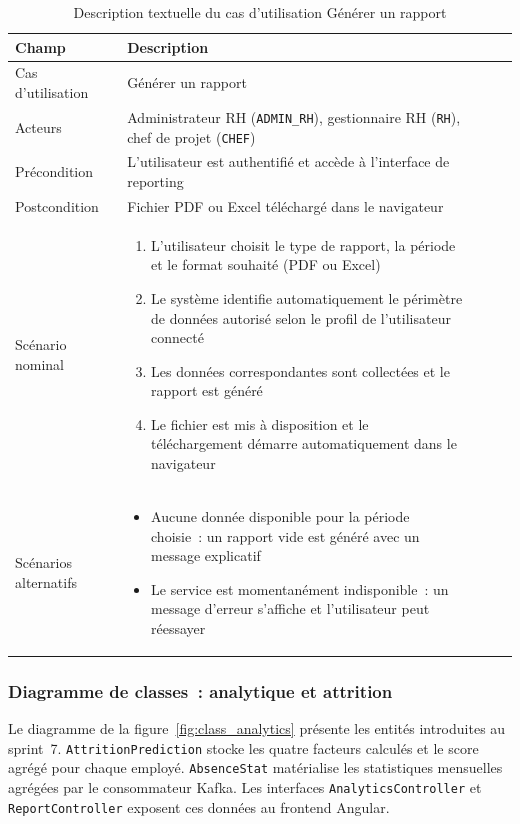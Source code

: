\begin{table}[H]
\centering
\caption{Description textuelle du cas d’utilisation Générer un rapport}
\label{tab:uc_rapport}
\begin{tabularx}{\textwidth}{VlVLV}
\hline
\textbf{Champ} & \textbf{Description} \\
\hline
Cas d’utilisation & Générer un rapport \\
\hline
Acteurs & Administrateur RH (\texttt{ADMIN\_RH}), gestionnaire RH (\texttt{RH}), chef de projet (\texttt{CHEF}) \\
\hline
Précondition & L’utilisateur est authentifié et accède à l’interface de reporting \\
\hline
Postcondition & Fichier PDF ou Excel téléchargé dans le navigateur \\
\hline
Scénario nominal &
\begin{enumerate}[leftmargin=*,nosep]
  \item L’utilisateur choisit le type de rapport, la période et le format souhaité (PDF ou Excel)
  \item Le système identifie automatiquement le périmètre de données autorisé selon le profil de l’utilisateur connecté
  \item Les données correspondantes sont collectées et le rapport est généré
  \item Le fichier est mis à disposition et le téléchargement démarre automatiquement dans le navigateur
\end{enumerate} \\
\hline
Scénarios alternatifs &
\begin{itemize}[leftmargin=*,nosep]
  \item Aucune donnée disponible pour la période choisie~: un rapport vide est généré avec un message explicatif
  \item Le service est momentanément indisponible~: un message d’erreur s’affiche et l’utilisateur peut réessayer
\end{itemize} \\
\hline
\end{tabularx}
\end{table}

\subsubsection*{Diagramme de classes~: analytique et attrition}

Le diagramme de la figure~\ref{fig:class_analytics} présente les entités introduites
au sprint~7. \texttt{AttritionPrediction} stocke les quatre facteurs calculés et le
score agrégé pour chaque employé. \texttt{AbsenceStat} matérialise les statistiques
mensuelles agrégées par le consommateur Kafka. Les interfaces \texttt{AnalyticsController}
et \texttt{ReportController} exposent ces données au frontend Angular.

